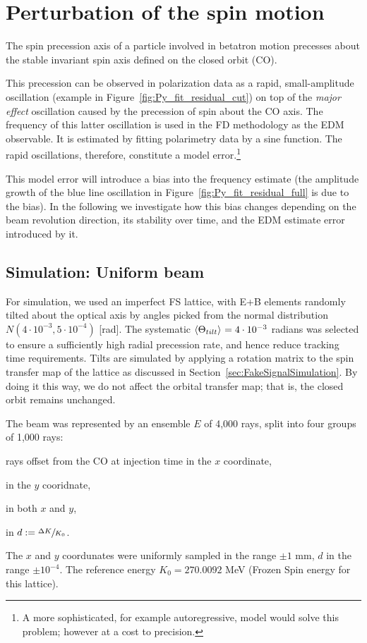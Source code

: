 \documentclass{article}
\begin{document}
\tableofcontents
\newpage

\section{Perturbation of the spin motion}\label{sec:SMP}
The spin precession axis of a particle involved in betatron motion precesses about the stable invariant spin axis defined on the closed orbit (CO).

This precession can be observed in polarization data as a rapid, small-amplitude oscillation (example in Figure~\ref{fig:Py_fit_residual_cut}) on top of the \emph{major effect} oscillation caused by the precession of spin about the CO axis. The frequency of this latter oscillation is used in the FD methodology as the EDM observable. It is estimated by fitting polarimetry data by a sine function. The rapid oscillations, therefore, constitute a model error.\footnote{A more sophisticated, for example autoregressive, model would solve this problem; however at a cost to precision.}

This model error will introduce a bias into the frequency estimate (the amplitude growth of the blue line oscillation in Figure~\ref{fig:Py_fit_residual_full} is due to the bias). In the following we investigate how this bias changes depending on the beam revolution direction, its stability over time, and the EDM estimate error introduced by it.

\subsection{Simulation: Uniform beam}
For simulation, we used an imperfect FS lattice, with E+B elements randomly tilted about the optical axis by angles picked from the normal distribution $N(4\cdot 10^{-3}, 5\cdot10^{-4})$ [rad]. The systematic $\avg{\Theta_{tilt}} = 4\cdot 10^{-3}$ radians was selected to ensure a sufficiently high radial precession rate, and hence reduce tracking time requirements. Tilts are simulated by applying a rotation matrix to the spin transfer map of the lattice as discussed in Section~\ref{sec:FakeSignalSimulation}. By doing it this way, we do not affect the orbital transfer map; that is, the closed orbit remains unchanged.

The beam was represented by an ensemble $E$ of 4,000 rays, split into four groups of 1,000 rays:
\begin{inparaenum}[1)]
\item rays offset from the CO at injection time in the $x$ coordinate,
\item in the $y$ cooridnate,
\item in both $x$ and $y$,
\item in $d := \sfrac{\Delta K}{K_0}$.
\end{inparaenum}
The $x$ and $y$ coordunates were uniformly sampled in the range $\pm 1$ mm, $d$ in the range $\pm 10^{-4}$. The reference energy $K_0 = 270.0092$ MeV (Frozen Spin energy for this lattice).
\end{document}
